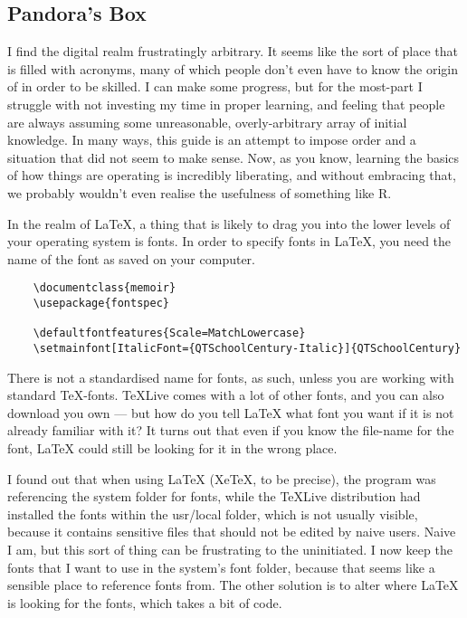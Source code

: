 \documentclass[12pt, oneside]{memoir}
\begin{document}
\subsection{Pandora's Box}
I find the digital realm frustratingly arbitrary. It seems like the sort of place that is filled with acronyms, many of which people don't even have to know the origin of in order to be skilled. I can make some progress, but for the most-part I struggle with not investing my time in proper learning, and feeling that people are always assuming some unreasonable, overly-arbitrary array of initial knowledge. In many ways, this guide is an attempt to impose order and a situation that did not seem to make sense. Now, as you know, learning the basics of how things are operating is incredibly liberating, and without embracing that, we probably wouldn't even realise the usefulness of something like R. 

In the realm of LaTeX, a thing that is likely to drag you into the lower levels of your operating system is fonts. In order to specify fonts in LaTeX, you need the name of the font as saved on your computer. 

\begin{verbatim}
    \documentclass{memoir}
    \usepackage{fontspec}
    
    \defaultfontfeatures{Scale=MatchLowercase}
    \setmainfont[ItalicFont={QTSchoolCentury-Italic}]{QTSchoolCentury}
\end{verbatim}

There is not a standardised name for fonts, as such, unless you are working with standard TeX-fonts. TeXLive comes with a lot of other fonts, and you can also download you own — but how do you tell LaTeX what font you want if it is not already familiar with it? It turns out that even if you know the file-name for the font, LaTeX could still be looking for it in the wrong place.

I found out that when using LaTeX (XeTeX, to be precise), the program was referencing the system folder for fonts, while the TeXLive distribution had installed the fonts within the usr/local folder, which is not usually visible, because it contains sensitive files that should not be edited by naive users. Naive I am, but this sort of thing can be frustrating to the uninitiated. I now keep the fonts that I want to use in the system's font folder, because that seems like a sensible place to reference fonts from. The other solution is to alter where LaTeX is looking for the fonts, which takes a bit of code.
\end{document}
